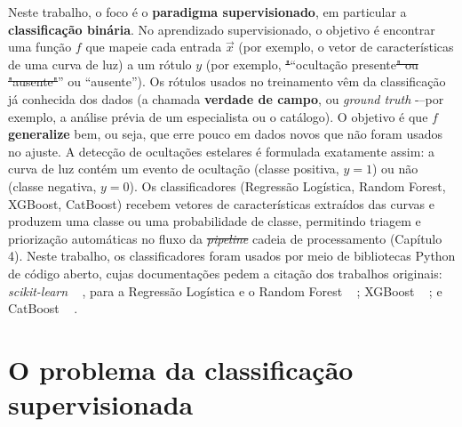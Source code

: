 \documentclass[msc]{on} %
\makeatletter
\providecommand{\DIFaddtex}[1]{{\protect\color{red}#1}} %
\providecommand{\DIFdeltex}[1]{{\protect\color{red}\sout{#1}}} %
\providecommand{\DIFaddbegin}{} %
\providecommand{\DIFaddend}{} %
\providecommand{\DIFdelbegin}{} %
\providecommand{\DIFdelend}{} %
\providecommand{\DIFadd}[1]{\texorpdfstring{\DIFaddtex{#1}}{#1}} %
\providecommand{\DIFdel}[1]{\texorpdfstring{\DIFdeltex{#1}}{}} %
\let\sout@orig\sout %
\renewcommand{\sout}[1]{\ifmmode\text{\sout@orig{\ensuremath{#1}}}\else\sout@orig{#1}\fi} %
\makeatother
\begin{document}
Neste trabalho, o foco é o \textbf{paradigma supervisionado}, em particular a \textbf{classificação binária}. No aprendizado supervisionado, o objetivo é encontrar uma função \(f\) que mapeie cada entrada \(\vec{x}\) (por exemplo, o vetor de características de uma curva de luz) a um rótulo \(y\) (por exemplo, \DIFdelbegin \DIFdel{"}\DIFdelend\ifhmode\hskip0pt\fi \DIFaddbegin \DIFadd{``}\DIFaddend ocultação presente\DIFdelbegin \DIFdel{" ou "ausente"}\DIFdelend\ifhmode\hskip0pt\fi \DIFaddbegin \DIFadd{'' ou ``ausente''}\DIFaddend ). Os rótulos usados no treinamento vêm da classificação já conhecida dos dados (a chamada \textbf{verdade de campo}, ou \textit{ground truth} -\DIFaddbegin \DIFadd{--}\DIFaddend  por exemplo, a análise prévia de um especialista ou o catálogo). O objetivo é que \(f\) \textbf{generalize} bem, ou seja, que erre pouco em dados novos que não foram usados no ajuste. A detecção de ocultações estelares é formulada exatamente assim: a curva de luz contém um evento de ocultação (classe positiva, \(y=1\)) ou não (classe negativa, \(y=0\)). Os classificadores (Regressão Logística, Random Forest, XGBoost, CatBoost) recebem vetores de características extraídos das curvas e produzem uma classe ou uma probabilidade de classe, permitindo triagem e priorização automáticas no fluxo da \DIFdelbegin \textit{\DIFdel{pipeline}} %
\DIFdelend\ifhmode\hskip0pt\fi \DIFaddbegin \DIFadd{cadeia de processamento }\DIFaddend (Capítulo 4). \DIFaddbegin \DIFadd{Neste trabalho, os classificadores foram usados por meio de bibliotecas Python de código aberto, cujas documentações pedem a citação dos trabalhos originais: }\textit{\DIFadd{scikit-learn}} \DIFadd{\mbox{%
\citep{ScikitLearn2011}}\hskip0pt%
, para a Regressão Logística e o Random Forest \mbox{%
\citep{Breiman2001}}\hskip0pt%
; XGBoost \mbox{%
\citep{Chen2016}}\hskip0pt%
; e CatBoost \mbox{%
\citep{Prokhorenkova2018}}\hskip0pt%
.
}\DIFaddend 

\section{O problema da classificação supervisionada}
\label{sec:problema_classificacao}
\label{sec:reglin_didatica}
\end{document}
